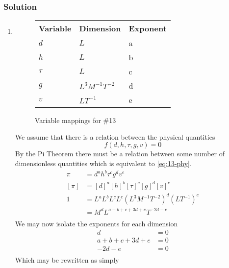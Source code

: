 \documentclass[12pt,twoside]{article}
\begin{document}
  \subsubsection*{Solution}
  \begin{enumerate}
  \item
    \begin{figure}
      \centering
      \begin{tabularx}{0.5\textwidth}{XXX}
        Variable & Dimension & Exponent \\ \midrule
        $d$ & $L$ & a \\
        $h$ & $L$ & b \\
        $\tau$ & $L$ & c \\
        $g$ & $L^3M^{-1}T^{-2}$ & d \\
        $v$ & $LT^{-1}$ & e \\
      \end{tabularx}
      \caption{Variable mappings for \#13}
\label{fig:13-var-mappings}
    \end{figure}
    We assume that there is a relation between the physical quantities
    \begin{equation}
      \label{eq:13-phy}
      f(d,h,\tau,g,v) = 0
    \end{equation}
    By the Pi Theorem there must be a relation between some number of
    dimensionless quantities which is equivalent to \cref{eq:13-phy}.
    \begin{equation*}
      \begin{aligned}
        \pi &= {d}^a {h}^b {\tau}^c {g}^d {v}^e \\
        [\pi] &= {[d]}^a {[h]}^b {[\tau]}^c {[g]}^d {[v]}^e \\
        1 &= L^{a}L^{b}L^{c}L^{c}{(L^3M^{-1}T^{-2})}^{d}{(LT^{-1})}^{e} \\
        &= M^{d}L^{a+b+c+3d+e}T^{-2d-e} \\
      \end{aligned}
    \end{equation*}
    We may now isolate the exponents for each dimension
    \begin{equation*}
      \begin{aligned}
        d &= 0 \\
        a + b + c + 3d + e &= 0 \\
        -2d - e &= 0 \\
      \end{aligned}
    \end{equation*}
    Which may be rewritten as simply

\end{enumerate}
\end{document}
